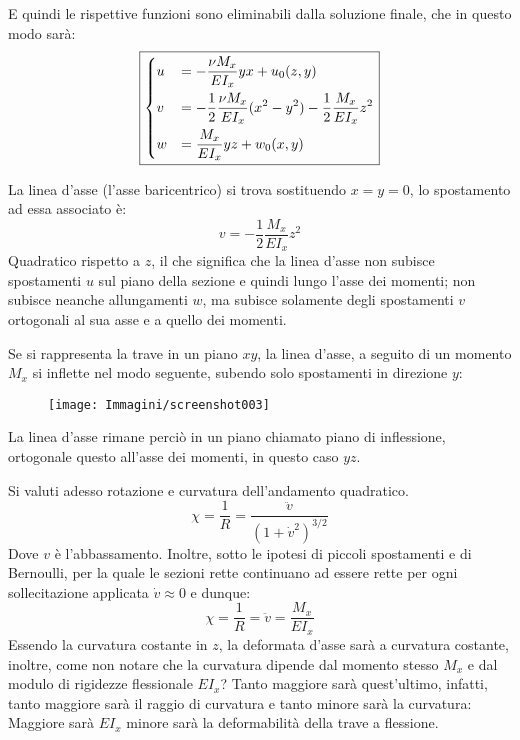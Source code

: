 \documentclass{article}
\begin{document}
\begin{adjustwidth}{2in}{}
		 E quindi le rispettive funzioni sono eliminabili dalla soluzione finale, che in questo modo sarà:
		\[\boxed{\begin{dcases}			
				u & = -\dfrac{\nu M_x}{EI_x}yx + u_0(z,y) \\
				v & = -\dfrac{1}{2}\dfrac{\nu M_x}{EI_x}(x^2 - y^2)  -\dfrac{1}{2}\dfrac{ M_x}{EI_x}z^2 \\
				w & = \dfrac{M_x}{EI_x}yz + w_0(x,y)	
		\end{dcases}} \]
		
		La linea d'asse (l'asse baricentrico) si trova sostituendo $x=y=0$, lo spostamento ad essa associato è:
		\[ v  = -\dfrac{1}{2}\dfrac{ M_x}{EI_x}z^2 \] 
		Quadratico rispetto a $z$, il che significa che la linea d'asse non subisce spostamenti $u$ sul piano della sezione e quindi lungo l'asse dei momenti; non subisce neanche allungamenti $w$, ma subisce solamente degli spostamenti $v$ ortogonali al sua asse e a quello dei momenti. \newline 
		
		Se si rappresenta la trave in un piano $xy$, la linea d'asse, a seguito di un momento $M_x$ si inflette nel modo seguente, subendo solo spostamenti in direzione $y$:
		
\begin{figure}[H]
	\centering
	\texttt{[image: Immagini/screenshot003]}
	\label{fig:screenshot003}
\end{figure}

		La linea d'asse rimane perciò in un piano chiamato piano di inflessione, ortogonale questo all'asse dei momenti, in questo caso $yz$. \newline 
		
		Si valuti adesso rotazione e curvatura dell'andamento quadratico. 
		\[ \chi = \dfrac{1}{R} = \dfrac{\ddot{v}}{(1+\dot{v}^2)^{3/2}}\]
		Dove $v$ è l'abbassamento. Inoltre, sotto le ipotesi di piccoli spostamenti e di Bernoulli, per la quale le sezioni rette continuano ad essere rette per ogni sollecitazione applicata $\dot{v}\approx 0$ e dunque: 
		\[ \chi = \dfrac{1}{R} = \ddot{v} = \dfrac{ M_x}{EI_x} \]
		Essendo la curvatura costante in $z$, la deformata d'asse sarà a curvatura costante, inoltre, come non notare che la curvatura dipende dal momento stesso $M_x$ e dal modulo di rigidezze flessionale $EI_x$? Tanto maggiore sarà quest'ultimo, infatti, tanto maggiore sarà il raggio di curvatura e tanto minore sarà la curvatura: Maggiore sarà $EI_x$ minore sarà la deformabilità della trave a flessione. \newline 
		

\end{adjustwidth}
\end{document}
